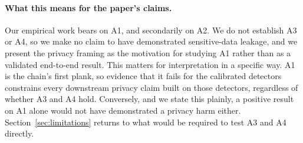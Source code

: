 \paragraph{What this means for the paper's claims.} Our empirical work bears on A1, and
secondarily on A2. We do not establish A3 or A4, so we make no claim to have demonstrated
sensitive-data leakage, and we present the privacy framing as the motivation for studying
A1 rather than as a validated end-to-end result. This matters for interpretation in a
specific way. A1 is the chain's first plank, so evidence that it fails for the calibrated
detectors constrains every downstream privacy claim built on those detectors, regardless
of whether A3 and A4 hold. Conversely, and we state this plainly, a positive result on A1
alone would not have demonstrated a privacy harm either. Section~\ref{sec:limitations}
returns to what would be required to test A3 and A4 directly.
